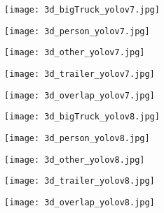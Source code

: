 \begin{figure}
	\begin{subfigure}{\textwidth}
		\centering
		\begin{subfigure}{0.2\textwidth}
			\texttt{[image: 3d\_bigTruck\_yolov7.jpg]}
		\end{subfigure}\hfill
		\begin{subfigure}{0.2\textwidth}
			\texttt{[image: 3d\_person\_yolov7.jpg]}
		\end{subfigure}\hfill
		\begin{subfigure}{0.2\textwidth}
			\texttt{[image: 3d\_other\_yolov7.jpg]}
		\end{subfigure}\hfill
		\begin{subfigure}{0.2\textwidth}
			\texttt{[image: 3d\_trailer\_yolov7.jpg]}
		\end{subfigure}\hfill
		\begin{subfigure}{0.2\textwidth}
			\texttt{[image: 3d\_overlap\_yolov7.jpg]}
		\end{subfigure}
		\vspace{-\baselineskip}
	\end{subfigure}
	
	
	\begin{subfigure}{\textwidth}
		\centering
		\begin{subfigure}{0.2\textwidth}
			\texttt{[image: 3d\_bigTruck\_yolov8.jpg]}
		\end{subfigure}\hfill
		\begin{subfigure}{0.2\textwidth}
			\texttt{[image: 3d\_person\_yolov8.jpg]}
		\end{subfigure}\hfill
		\begin{subfigure}{0.2\textwidth}
			\texttt{[image: 3d\_other\_yolov8.jpg]}
		\end{subfigure}\hfill
		\begin{subfigure}{0.2\textwidth}
			\texttt{[image: 3d\_trailer\_yolov8.jpg]}
		\end{subfigure}\hfill
		\begin{subfigure}{0.2\textwidth}
			\texttt{[image: 3d\_overlap\_yolov8.jpg]}
		\end{subfigure}
		\vspace{-\baselineskip}
	\end{subfigure}
	

\end{figure}
